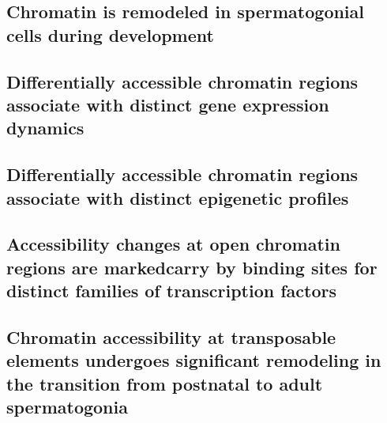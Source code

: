 \documentclass[12pt,twoside]{reedthesis}
\begin{document}
\hypertarget{chromatin-is-remodeled-in-spermatogonial-cells-during-development}{%
\subsection{Chromatin is remodeled in spermatogonial cells during development}\label{chromatin-is-remodeled-in-spermatogonial-cells-during-development}}

\hypertarget{differentially-accessible-chromatin-regions-associate-with-distinct-gene-expression-dynamics}{%
\subsection{Differentially accessible chromatin regions associate with distinct gene expression dynamics}\label{differentially-accessible-chromatin-regions-associate-with-distinct-gene-expression-dynamics}}

\hypertarget{differentially-accessible-chromatin-regions-associate-with-distinct-epigenetic-profiles}{%
\subsection{Differentially accessible chromatin regions associate with distinct epigenetic profiles}\label{differentially-accessible-chromatin-regions-associate-with-distinct-epigenetic-profiles}}

\hypertarget{accessibility-changes-at-open-chromatin-regions-are-markedcarry-by-binding-sites-for-distinct-families-of-transcription-factors}{%
\subsection{Accessibility changes at open chromatin regions are markedcarry by binding sites for distinct families of transcription factors}\label{accessibility-changes-at-open-chromatin-regions-are-markedcarry-by-binding-sites-for-distinct-families-of-transcription-factors}}

\hypertarget{chromatin-accessibility-at-transposable-elements-undergoes-significant-remodeling-in-the-transition-from-postnatal-to-adult-spermatogonia}{%
\subsection{Chromatin accessibility at transposable elements undergoes significant remodeling in the transition from postnatal to adult spermatogonia}\label{chromatin-accessibility-at-transposable-elements-undergoes-significant-remodeling-in-the-transition-from-postnatal-to-adult-spermatogonia}}
\end{document}
